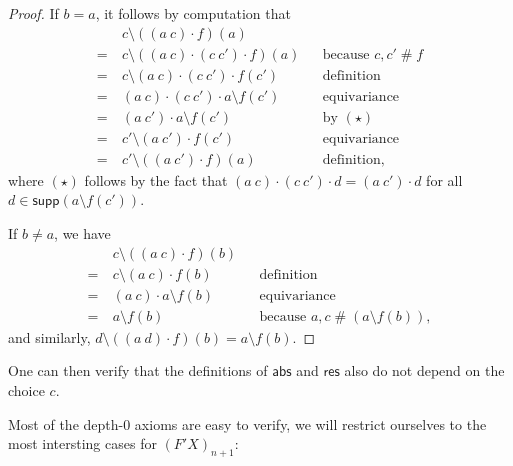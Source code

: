 \documentclass[11pt,a4paper]{amsart}
\newcommand{\abs}{\mathsf{abs}}
\newcommand{\res}{\mathsf{res}}
\newcommand{\fresh}{\mathbin{\#}}
\newcommand{\supp}{\mathsf{supp}}
\theoremstyle{plain}
\numberwithin{equation}{section}
\newcommand{\+}[1]{\mathcal{#1}\xspace}
\theoremstyle{definition}
\begin{document}
\begin{proof}
  If \(b = a\), it follows by computation that
  \begin{align*}
    &c \setminus ((a\ c) \cdot f)(a) \\
    =~&c \setminus ((a\ c) \cdot (c\ c') \cdot f)(a) && \text{because } c,c'\fresh f \\
    =~&c \setminus (a\ c) \cdot (c\ c') \cdot f(c') && \text{definition} \\
    =~&(a\ c) \cdot (c\ c') \cdot a \setminus f(c') && \text{equivariance} \\
    =~&(a\ c') \cdot a \setminus f(c') && \text{by } (\star) \\
    =~&c' \setminus (a\ c') \cdot f(c') && \text{equivariance} \\
    =~&c' \setminus ((a\ c') \cdot f)(a) && \text{definition},
  \end{align*}
  where \((\star)\) follows by the fact that \((a\ c) \cdot (c\ c') \cdot d = (a\ c') \cdot d\) for all \(d \in \supp(a \setminus f(c'))\).

  If \(b \neq a\), we have
  \begin{align*}
    &c \setminus ((a\ c) \cdot f)(b) \\
    =~&c \setminus (a\ c) \cdot f(b) && \text{definition} \\
    =~&(a\ c) \cdot a \setminus f(b) && \text{equivariance} \\
    =~&a \setminus f(b) && \text{because } a,c\fresh(a \setminus f(b)),
  \end{align*}
  and similarly, \(d \setminus ((a\ d) \cdot f)(b) = a \setminus f(b)\).
\end{proof}

One can then verify that the definitions of \(\abs\) and \(\res\) also do not depend on the choice \(c\).

Most of the depth-$0$ axioms are easy to verify, we will restrict ourselves to the most intersting cases for $(F'X)_{n + 1}$:
\end{document}
